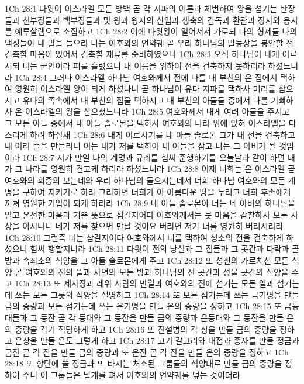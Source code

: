 1Ch 28:1  다윗이 이스라엘 모든 방백 곧 각 지파의 어른과 체번하여 왕을 섬기는 반장들과 천부장들과 백부장들과 및 왕과 왕자의 산업과 생축의 감독과 환관과 장사와 용사를 예루살렘으로 소집하고
1Ch 28:2  이에 다윗왕이 일어서서 가로되 나의 형제들 나의 백성들아 내 말을 들으라 나는 여호와의 언약궤 곧 우리 하나님의 발등상을 봉안할 전 건축할 마음이 있어서 건축할 재료를 준비하였으나
1Ch 28:3  오직 하나님이 내게 이르시되 너는 군인이라 피를 흘렸으니 내 이름을 위하여 전을 건축하지 못하리라 하셨느니라
1Ch 28:4  그러나 이스라엘 하나님 여호와께서 전에 나를 내 부친의 온 집에서 택하여 영원히 이스라엘 왕이 되게 하셨나니 곧 하나님이 유다 지파를 택하사 머리를 삼으시고 유다의 족속에서 내 부친의 집을 택하시고 내 부친의 아들들 중에서 나를 기뻐하사 온 이스라엘의 왕을 삼으셨느니라
1Ch 28:5  여호와께서 내게 여러 아들을 주시고 그 모든 아들 중에서 내 아들 솔로몬을 택하사 여호와의 나라 위에 앉혀 이스라엘을 다스리게 하려 하실새
1Ch 28:6  내게 이르시기를 네 아들 솔로몬 그가 내 전을 건축하고 내 여러 뜰을 만들리니 이는 내가 저를 택하여 내 아들을 삼고 나는 그 아비가 될 것임이라
1Ch 28:7  저가 만일 나의 계명과 규례를 힘써 준행하기를 오늘날과 같이 하면 내가 그 나라를 영원히 견고케 하리라 하셨느니라
1Ch 28:8  이제 너희는 온 이스라엘 곧 여호와의 회중의 보는데와 우리 하나님의 들으시는데서 너희 하나님 여호와의 모든 계명을 구하여 지키기로 하라 그리하면 너희가 이 아름다운 땅을 누리고 너희 후손에게 끼쳐 영원한 기업이 되게 하리라
1Ch 28:9  내 아들 솔로몬아 너는 네 아비의 하나님을 알고 온전한 마음과 기쁜 뜻으로 섬길지어다 여호와께서는 뭇 마음을 감찰하사 모든 사상을 아시나니 네가 저를 찾으면 만날 것이요 버리면 저가 너를 영원히 버리시리라
1Ch 28:10  그런즉 너는 삼갈지어다 여호와께서 너를 택하여 성소의 전을 건축하게 하셨으니 힘써 행할지니라
1Ch 28:11  다윗이 전의 낭실과 그 집들과 그 곳간과 다락과 골방과 속죄소의 식양을 그 아들 솔로몬에게 주고
1Ch 28:12  또 성신의 가르치신 모든 식양 곧 여호와의 전의 뜰과 사면의 모든 방과 하나님의 전 곳간과 성물 곳간의 식양을 주고
1Ch 28:13  또 제사장과 레위 사람의 반열과 여호와의 전에 섬기는 모든 일과 섬기는데 쓰는 모든 그릇의 식양을 설명하고
1Ch 28:14  또 모든 섬기는데 쓰는 금기명을 만들 금의 중량과 모든 섬기는데 쓰는 은기명을 만들 은의 중량을 정하고
1Ch 28:15  또 금등대들과 그 등잔 곧 각 등대와 그 등잔을 만들 금의 중량과 은등대와 그 등잔을 만들 은의 중량을 각기 적당하게 하고
1Ch 28:16  또 진설병의 각 상을 만들 금의 중량을 정하고 은상을 만들 은도 그렇게 하고
1Ch 28:17  고기 갈고리와 대접과 종자를 만들 정금과 금잔 곧 각 잔을 만들 금의 중량과 또 은잔 곧 각 잔을 만들 은의 중량을 정하고
1Ch 28:18  또 향단에 쓸 정금과 또 타시는 처소된 그룹들의 식양대로 만들 금의 중량을 정하여 주니 이 그룹들은 날개를 펴서 여호와의 언약궤를 덮는 것이더라
